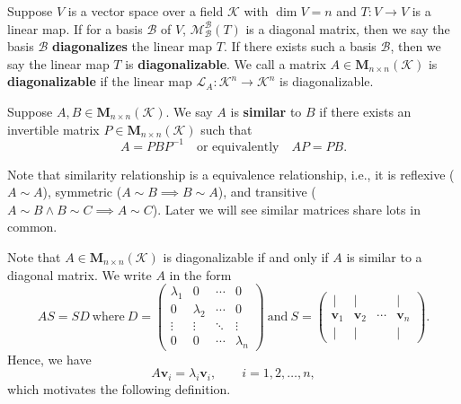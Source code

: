 	\begin{definitionenv}
		Suppose $V$ is a vector space over a field $\mathcal{K}$ with $\dim V = n$ and $T:V\to V$ is a linear map. If for a basis $\mathcal{B}$ of $V$, $\mathcal{M}_\mathcal{B}^\mathcal{B}(T)$ is a diagonal matrix, then we say the basis $\mathcal{B}$ \textbf{diagonalizes} the linear map $T$. If there exists such a basis $\mathcal{B}$, then we say the linear map $T$ is \textbf{diagonalizable}. We call a matrix $A \in \bm{M}_{n \times n}(\mathcal{K})$ is \textbf{diagonalizable} if the linear map $\mathcal{L}_A: \mathcal{K}^n \to \mathcal{K}^n$ is diagonalizable.
	\end{definitionenv}
	\begin{definitionenv}
		Suppose $A,B\in \bm{M}_{n \times n}(\mathcal{K})$. We say $A$ is \textbf{similar} to $B$ if there exists an invertible matrix $P \in \bm{M}_{n \times n}(\mathcal{K})$ such that
		\[
		A = P B P^{-1}\quad\text{or equivalently}\quad AP=PB.
		\]
	\end{definitionenv}
	\begin{remarkenv}
		Note that similarity relationship is a equivalence relationship, i.e., it is reflexive ($A \sim A$), symmetric ($A \sim B \implies B \sim A$), and transitive ($A \sim B \wedge B \sim C \implies A \sim C$). Later we will see similar matrices share lots in common.
	\end{remarkenv}
	\begin{propositionenv}
		Note that $A \in \bm{M}_{n\times n}(\mathcal{K})$ is diagonalizable if and only if $A$ is similar to a diagonal matrix. We write $A$ in the form
		\[
		AS = SD
		\ \text{where}\ 
		D =
		\begin{pmatrix}
		\lambda_1 & 0        & \cdots & 0 \\
		0         & \lambda_2& \cdots & 0 \\
		\vdots    & \vdots   & \ddots & \vdots \\
		0         & 0        & \cdots & \lambda_n
		\end{pmatrix}
		\ \text{and}\ 
		S =
		\begin{pmatrix}
		\,|      & |      &        & |\, \\
		\bm{v}_1 & \bm{v}_2 & \cdots & \bm{v}_n \\
		\,|      & |      &        & |\,
		\end{pmatrix}.
		\]
		Hence, we have
		\[
		A\bm{v}_i = \lambda_i \bm{v}_i, \qquad i = 1,2,\ldots,n,
		\]
		which motivates the following definition.
	\end{propositionenv}

